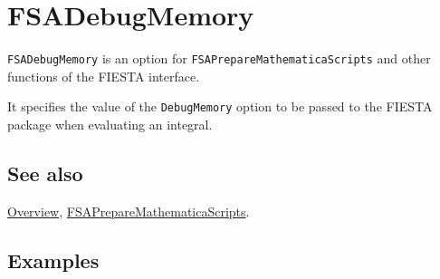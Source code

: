 \documentclass[../FeynHelpersManual.tex]{subfiles}
\begin{document}
\hypertarget{fsadebugmemory}{
\section{FSADebugMemory}\label{fsadebugmemory}}

\texttt{FSADebugMemory} is an option for
\texttt{FSAPrepareMathematicaScripts} and other functions of the FIESTA
interface.

It specifies the value of the \texttt{DebugMemory} option to be passed
to the FIESTA package when evaluating an integral.

\subsection{See also}

\hyperlink{toc}{Overview},
\hyperlink{fsapreparemathematicascripts}{FSAPrepareMathematicaScripts}.

\subsection{Examples}
\end{document}
